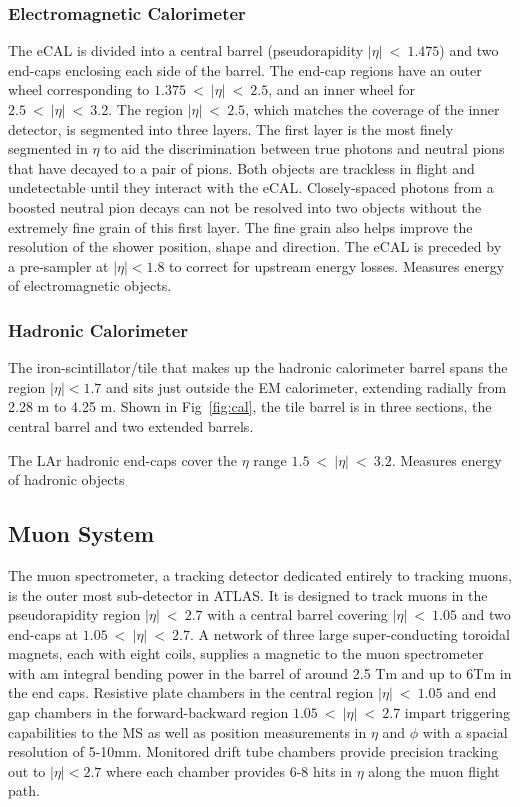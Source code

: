 \subsubsection{Electromagnetic Calorimeter}
The eCAL is divided into a central barrel (pseudorapidity $|\eta|~<~1.475$) and two end-caps enclosing each side of the barrel.  The end-cap regions have an outer wheel corresponding to $1.375~<~|\eta|~<~2.5$, and an inner wheel for $2.5~<~|\eta|~<~3.2$.  The region $|\eta|~<~2.5$, which matches the coverage of the inner detector, is segmented into three layers.  The first layer is the most finely segmented in $\eta$ to aid the discrimination between true photons and neutral pions that have decayed to a pair of pions.  Both objects are trackless in flight and undetectable until they interact with the eCAL.  Closely-spaced photons from a boosted neutral pion decays can not be resolved into two objects without the extremely fine grain of this first layer.  The fine grain also helps improve the resolution of the shower position, shape and direction.  The eCAL is preceded by a pre-sampler at $|\eta| < 1.8$ to correct for upstream energy losses.
Measures energy of electromagnetic objects.

\subsubsection{Hadronic Calorimeter}
The iron-scintillator/tile that makes up the hadronic calorimeter barrel spans the region $|\eta| < 1.7$ and sits just outside the EM calorimeter, extending radially from 2.28 m to 4.25 m.  Shown in Fig~\ref{fig:cal}, the tile barrel is in three sections, the central barrel and two extended barrels. 

The LAr hadronic end-caps cover the $\eta$ range $1.5~<~|\eta|~<~3.2$.  Measures energy of hadronic objects

\subsection{Muon System}
The muon spectrometer, a tracking detector dedicated entirely to tracking muons, is the outer most sub-detector in ATLAS.  It is designed to track muons in the pseudorapidity region $|\eta|~<~2.7$ with a central barrel covering $|\eta|~<~1.05$ and two end-caps at $1.05~<~|\eta|~<~2.7$.  A network of three large super-conducting toroidal magnets, each with eight coils, supplies a magnetic to the muon spectrometer with am integral bending power in the barrel of around 2.5 Tm and up to 6Tm in the end caps.  Resistive plate chambers in the central region $|\eta|~<~1.05$ and end gap chambers in the forward-backward region $1.05~<~|\eta|~<~2.7$ impart triggering capabilities to the MS as well as position measurements in $\eta$ and $\phi$ with a spacial resolution of 5-10mm. Monitored drift tube chambers provide precision tracking out to $|\eta| < 2.7$ where each chamber provides 6-8 hits in $\eta$ along the muon flight path. 

